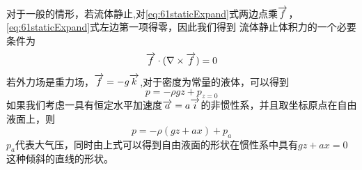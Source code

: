 对于一般的情形，若流体静止,对\eqref{eq:61staticExpand}式两边点乘$\overrightarrow{f}$，\eqref{eq:61staticExpand}式左边第一项得零，因此我们得到
流体静止体积力的一个必要条件为
\begin{equation}
\overrightarrow{f}\cdot (\nabla \times \overrightarrow{f})=0
\end{equation}
若外力场是重力场，$\overrightarrow{f}=-g\overrightarrow{k}$,对于密度为常量的液体，可以得到
\begin{equation}
p=-\rho g z + p_{z=0}
\end{equation}
如果我们考虑一具有恒定水平加速度$\overrightarrow{a}=a\overrightarrow{i}$的非惯性系，并且取坐标原点在自由液面上，则
\begin{equation}
p=-\rho(gz+ax)+p_a
\end{equation}
$p_a$代表大气压，同时由上式可以得到自由液面的形状在惯性系中具有$gz+ax=0$这种倾斜的直线的形状。